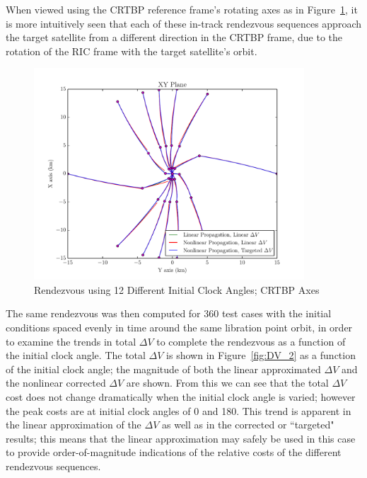 \documentclass[letterpaper, preprint, paper,11pt]{AAS}	%
\begin{document}
\clearpage

When viewed using the CRTBP reference frame's rotating axes as in Figure~\ref{fig:RLP_2}, it is more intuitively seen that each of these in-track rendezvous sequences approach the target satellite from a different direction in the CRTBP frame, due to the rotation of the RIC frame with the target satellite's orbit.

\begin{figure}[htb] 
	\begin{center}
		\includegraphics[width=0.9\textwidth]{RLP_2} %
		\caption{Rendezvous using 12 Different Initial Clock Angles; CRTBP Axes}
		\label{fig:RLP_2}
	\end{center}
\end{figure}

The same rendezvous was then computed for 360 test cases with the initial conditions spaced evenly in time around the same libration point orbit, in order to examine the trends in total \(\Delta V\) to complete the rendezvous as a function of the initial clock angle. The total \(\Delta V\) is shown in Figure~\ref{fig:DV_2} as a function of the initial clock angle; the magnitude of both the linear approximated \(\Delta V\) and the nonlinear corrected \(\Delta V\) are shown.  From this we can see that the total \(\Delta V\) cost does not change dramatically when the initial clock angle is varied; however the peak costs are at initial clock angles of 0\textdegree \- and 180\textdegree.  This trend is apparent in the linear approximation of the \(\Delta V\) as well as in the corrected or ``targeted" results; this means that the linear approximation may safely be used in this case to provide order-of-magnitude indications of the relative costs of the different rendezvous sequences.
\end{document}
